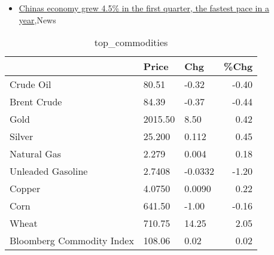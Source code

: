 \documentclass{article}%
\begin{document}
%
\begin{itemize}%
\item%
\href{https://reddit.com/r/Economics/comments/12q6o8c/chinas\_economy\_grew\_45\_in\_the\_first\_quarter\_the/}{Chinas economy grew 4.5\% in the first quarter, the fastest pace in a year},News%
\end{itemize}%


\begin{table}[htbp]%
\caption{top\_commodities}%
\centering%
\begin{adjustbox}{width=1\textwidth}%
\begin{tabular}{lllr}
\toprule
                          &   Price &     Chg &  \%Chg \\
\midrule
               Crude Oil  &   80.51 &   -0.32 & -0.40 \\
             Brent Crude  &   84.39 &   -0.37 & -0.44 \\
                    Gold  & 2015.50 &    8.50 &  0.42 \\
                  Silver  &  25.200 &   0.112 &  0.45 \\
             Natural Gas  &   2.279 &   0.004 &  0.18 \\
       Unleaded Gasoline  &  2.7408 & -0.0332 & -1.20 \\
                  Copper  &  4.0750 &  0.0090 &  0.22 \\
                    Corn  &  641.50 &   -1.00 & -0.16 \\
                   Wheat  &  710.75 &   14.25 &  2.05 \\
Bloomberg Commodity Index &  108.06 &    0.02 &  0.02 \\
\bottomrule
\end{tabular}
%
\end{adjustbox}%
\end{table}

%
\end{document}
